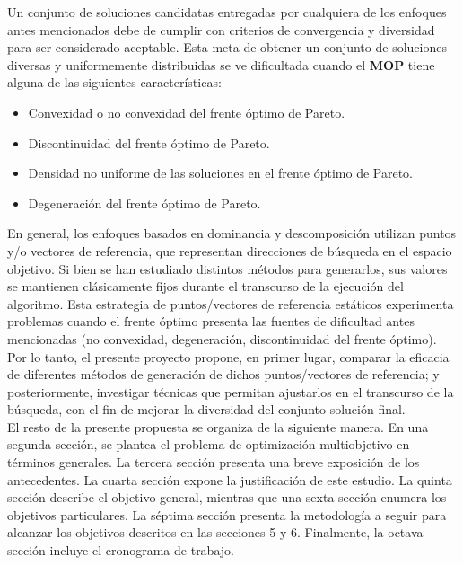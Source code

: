 \documentclass[letterpaper,10pt]{article}
\begin{document}
Un conjunto de soluciones candidatas entregadas por cualquiera de los enfoques antes mencionados debe de cumplir con criterios de convergencia y diversidad para ser
considerado aceptable. Esta meta de obtener un conjunto de soluciones diversas y uniformemente distribuidas se ve dificultada cuando el \textbf{MOP} tiene alguna de las siguientes características:

\begin{itemize}
 \item Convexidad o no convexidad del frente óptimo de Pareto.
 \item Discontinuidad del frente óptimo de Pareto.
 \item Densidad no uniforme de las soluciones en el frente óptimo de Pareto.
 \item Degeneración del frente óptimo de Pareto.
\end{itemize}

En general, los enfoques basados en dominancia y descomposición utilizan puntos y/o vectores de referencia, que representan direcciones de búsqueda en el espacio objetivo. Si bien se han estudiado distintos métodos para generarlos,
sus valores se mantienen clásicamente fijos durante el transcurso de la ejecución del algoritmo. Esta estrategia de puntos/vectores de referencia estáticos experimenta problemas cuando el frente óptimo presenta las fuentes de dificultad antes mencionadas (no convexidad, degeneración, discontinuidad del frente óptimo).\\

Por lo tanto, el presente proyecto propone, en primer lugar, comparar la eficacia de diferentes métodos de generación de dichos puntos/vectores de referencia;
y posteriormente, investigar técnicas que permitan ajustarlos en el transcurso de la búsqueda, con el fin de mejorar la diversidad del conjunto solución final.\\

El resto de la presente propuesta se organiza de la siguiente manera. En una segunda sección, se plantea el problema de optimización multiobjetivo en términos generales.
La tercera sección presenta una breve exposición de los antecedentes. La cuarta sección expone la justificación de este estudio. La quinta sección describe el objetivo general,
mientras que una sexta sección enumera los objetivos particulares. La séptima sección presenta la metodología a seguir para alcanzar los objetivos descritos en las secciones 5 y 6.
Finalmente, la octava sección incluye el cronograma de trabajo.
\end{document}
